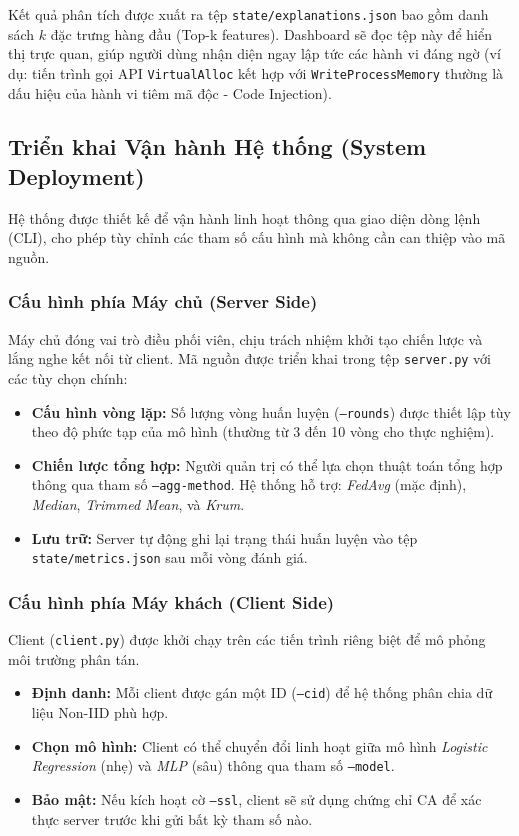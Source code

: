 Kết quả phân tích được xuất ra tệp \texttt{state/explanations.json} bao gồm danh sách $k$ đặc trưng hàng đầu (Top-k features). Dashboard sẽ đọc tệp này để hiển thị trực quan, giúp người dùng nhận diện ngay lập tức các hành vi đáng ngờ (ví dụ: tiến trình gọi API \texttt{VirtualAlloc} kết hợp với \texttt{WriteProcessMemory} thường là dấu hiệu của hành vi tiêm mã độc - Code Injection).
\subsection{Triển khai Vận hành Hệ thống (System Deployment)}

Hệ thống được thiết kế để vận hành linh hoạt thông qua giao diện dòng lệnh (CLI), cho phép tùy chỉnh các tham số cấu hình mà không cần can thiệp vào mã nguồn.

\subsubsection{Cấu hình phía Máy chủ (Server Side)}
Máy chủ đóng vai trò điều phối viên, chịu trách nhiệm khởi tạo chiến lược và lắng nghe kết nối từ client. Mã nguồn được triển khai trong tệp \texttt{server.py} với các tùy chọn chính:
\begin{itemize}
    \item \textbf{Cấu hình vòng lặp:} Số lượng vòng huấn luyện (\texttt{--rounds}) được thiết lập tùy theo độ phức tạp của mô hình (thường từ 3 đến 10 vòng cho thực nghiệm).
    \item \textbf{Chiến lược tổng hợp:} Người quản trị có thể lựa chọn thuật toán tổng hợp thông qua tham số \texttt{--agg-method}. Hệ thống hỗ trợ: \textit{FedAvg} (mặc định), \textit{Median}, \textit{Trimmed Mean}, và \textit{Krum}.
    \item \textbf{Lưu trữ:} Server tự động ghi lại trạng thái huấn luyện vào tệp \texttt{state/metrics.json} sau mỗi vòng đánh giá.
\end{itemize}

\subsubsection{Cấu hình phía Máy khách (Client Side)}
Client (\texttt{client.py}) được khởi chạy trên các tiến trình riêng biệt để mô phỏng môi trường phân tán.
\begin{itemize}
    \item \textbf{Định danh:} Mỗi client được gán một ID (\texttt{--cid}) để hệ thống phân chia dữ liệu Non-IID phù hợp.
    \item \textbf{Chọn mô hình:} Client có thể chuyển đổi linh hoạt giữa mô hình \textit{Logistic Regression} (nhẹ) và \textit{MLP} (sâu) thông qua tham số \texttt{--model}.
    \item \textbf{Bảo mật:} Nếu kích hoạt cờ \texttt{--ssl}, client sẽ sử dụng chứng chỉ CA để xác thực server trước khi gửi bất kỳ tham số nào.
\end{itemize}



